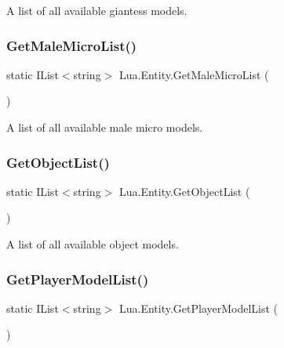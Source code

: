 A list of all available giantess models. 

\mbox{\label{class_lua_1_1_entity_a7d49be266385d4155691a2349d964b81}} 
\subsubsection{\texorpdfstring{GetMaleMicroList()}{GetMaleMicroList()}}
{\footnotesize\ttfamily static I\+List$<$string$>$ Lua.\+Entity.\+Get\+Male\+Micro\+List (\begin{DoxyParamCaption}{ }\end{DoxyParamCaption})\hspace{0.3cm}{\ttfamily [static]}}



A list of all available male micro models. 

\mbox{\label{class_lua_1_1_entity_aacd0f73c8377462b354deb3bc73c6b40}} 
\subsubsection{\texorpdfstring{GetObjectList()}{GetObjectList()}}
{\footnotesize\ttfamily static I\+List$<$string$>$ Lua.\+Entity.\+Get\+Object\+List (\begin{DoxyParamCaption}{ }\end{DoxyParamCaption})\hspace{0.3cm}{\ttfamily [static]}}



A list of all available object models. 

\mbox{\label{class_lua_1_1_entity_abf1acc0c0ad6baa7224c8f3e088caf0f}} 
\subsubsection{\texorpdfstring{GetPlayerModelList()}{GetPlayerModelList()}}
{\footnotesize\ttfamily static I\+List$<$string$>$ Lua.\+Entity.\+Get\+Player\+Model\+List (\begin{DoxyParamCaption}{ }\end{DoxyParamCaption})\hspace{0.3cm}{\ttfamily [static]}}



